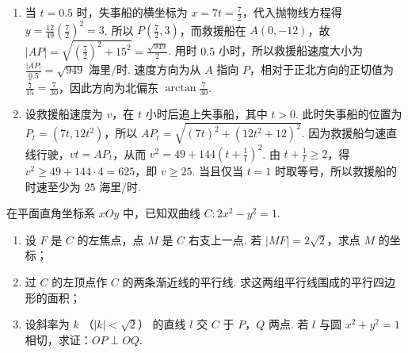 \begin{solution}
\begin{enumerate}
\item 当 \(t=0.5\) 时，失事船的横坐标为 \(x=7t=\frac72\)，代入抛物线方程得 \(y=\frac{12}{49}\left(\frac72\right)^2=3\). 所以 \(P\left(\frac72,3\right)\)，而救援船在 \(A(0,-12)\)，故 \(|AP|=\sqrt{\left(\frac72\right)^2+15^2}=\frac{\sqrt{949}}{2}\). 用时 \(0.5\) 小时，所以救援船速度大小为 \(\frac{|AP|}{0.5}=\sqrt{949}\text{ 海里/时}\). 速度方向为从 \(A\) 指向 \(P\)，相对于正北方向的正切值为 \(\frac{\frac{7}{2}}{15}=\frac7{30}\)，因此方向为北偏东 \(\arctan\frac7{30}\).
\item 设救援船速度为 \(v\)，在 \(t\) 小时后追上失事船，其中 \(t>0\). 此时失事船的位置为 \(P_t=(7t,12t^2)\)，所以 \(AP_t=\sqrt{(7t)^2+(12t^2+12)^2}\). 因为救援船匀速直线行驶，\(vt=AP_t\)，从而 \(v^2=49+144\left(t+\frac1t\right)^2\). 由 \(t+\frac1t\geqslant2\)，得 \(v^2\geqslant49+144\cdot4=625\)，即 \(v\geqslant25\). 当且仅当 \(t=1\) 时取等号，所以救援船的时速至少为 \(25\text{ 海里/时}\).
\end{enumerate}
\end{solution}

\begin{problem}
在平面直角坐标系 \(xOy\) 中，已知双曲线 \(C: 2x^{2} - y^{2} = 1\).
\begin{enumerate}
\item 设 \(F\) 是 \(C\) 的左焦点，点 \(M\) 是 \(C\) 右支上一点. 若 \(|MF| = 2\sqrt{2}\)，求点 \(M\) 的坐标；
\item 过 \(C\) 的左顶点作 \(C\) 的两条渐近线的平行线. 求这两组平行线围成的平行四边形的面积；
\item 设斜率为 \(k\) （\(|k| < \sqrt{2}\)） 的直线 \(l\) 交 \(C\) 于 \(P\)，\(Q\) 两点. 若 \(l\) 与圆 \(x^{2} + y^{2} = 1\) 相切，求证：\(OP \perp OQ\).
\end{enumerate}
\end{problem}

